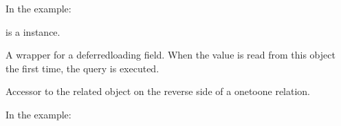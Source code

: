 \documentclass[letterpaper,10pt,french]{sphinxmanual}
\begin{document}
\begin{fulllineitems}
\begin{fulllineitems}
\sphinxAtStartPar
In the example:

\begin{sphinxVerbatim}[commandchars=\\\{\}]
 
       
\end{sphinxVerbatim}

\sphinxAtStartPar
{} is a  instance.

\end{fulllineitems}


\begin{fulllineitems}
\label{\detokenize{main/model:main.models.Personnel.email}}
\pysigstartsignatures
{}
\pysigstopsignatures
\sphinxAtStartPar
A wrapper for a deferred\sphinxhyphen{}loading field. When the value is read from this
object the first time, the query is executed.

\end{fulllineitems}


\begin{fulllineitems}
\label{\detokenize{main/model:main.models.Personnel.enseignant}}
\pysigstartsignatures
{}
\pysigstopsignatures
\sphinxAtStartPar
Accessor to the related object on the reverse side of a one\sphinxhyphen{}to\sphinxhyphen{}one
relation.

\sphinxAtStartPar
In the example:

\begin{sphinxVerbatim}[commandchars=\\\{\}]
 
       
\end{sphinxVerbatim}


\end{fulllineitems}
\end{fulllineitems}
\end{document}

